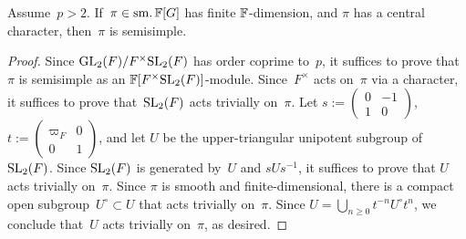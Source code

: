 \documentclass[oneside,a4paper,english, 11pt]{amsart}
\begin{document}
\begin{lemma}\label{lem:finite implies semisimple}
Assume~$p > 2$.
If~$\pi \in \operatorname{sm.} \mathbb{F}[G]$ has finite $\mathbb{F}$-dimension, and $\pi$ has a central character, then~$\pi$ is semisimple. 
\end{lemma}
\begin{proof}
    Since $\mathrm{GL}_2(F)/F^\times\mathrm{SL}_2(F)$ has order coprime to~$p$, it suffices to prove that $\pi$ is semisimple as an $\mathbb{F}[F^\times\mathrm{SL}_2(F)]$-module.
    Since~$F^\times$ acts on~$\pi$ via a character, it suffices to prove that~$\mathrm{SL}_2(F)$ acts trivially on~$\pi$.
    Let $s:= \left (\begin{smallmatrix}
        0 & {-1} \\ 1 & 0
    \end{smallmatrix} \right )$,
    $t:= \left (\begin{smallmatrix}
        \varpi_F & 0 \\ 0 & 1
    \end{smallmatrix} \right )$, and let $U$ be the upper-triangular unipotent subgroup of $\mathrm{SL}_2(F)$.
    Since $\mathrm{SL}_2(F)$ is generated by~$U$ and $sUs^{-1}$, it suffices to prove that $U$ acts trivially on~$\pi$.
    Since $\pi$ is smooth and finite-dimensional, there is a compact open subgroup~$U^\circ\subset U$ that acts trivially on~$\pi$.
    Since $U = \bigcup_{n \geq 0} t^{-n}U^\circ t^n$, we conclude that~$U$ acts trivially on~$\pi$, as desired. 
\end{proof}
\end{document}
